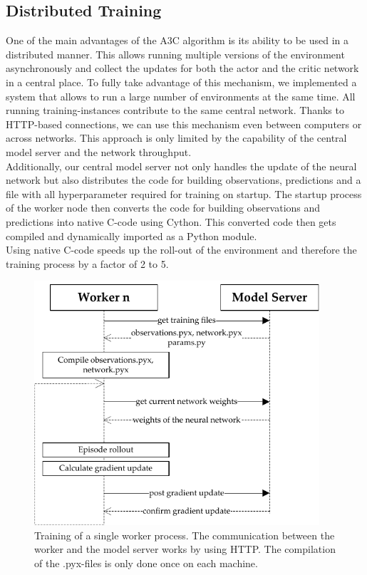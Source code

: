 \subsection*{Distributed Training}
One of the main advantages of the A3C algorithm is its ability to be used in a distributed manner. This allows running multiple versions of the environment asynchronously and collect the updates for both the actor and the critic network in a central place. To fully take advantage of this mechanism, we implemented a system that allows to run a large number of environments at the same time. All running training-instances contribute to the same central network. Thanks to HTTP-based connections, we can use this mechanism even between computers or across networks. This approach is only limited by the capability of the central model server and the network throughput.\\
Additionally, our central model server not only handles the update of the neural network but also distributes the code for building observations, predictions and a file with all hyperparameter required for training on startup. The startup process of the worker node then converts the code for building observations and predictions into native C-code using Cython. This converted code then gets compiled and dynamically imported as a Python module.\\
Using native C-code speeds up the roll-out of the environment and therefore the training process by a factor of 2 to 5.
\begin{figure}[H]
	\centering
	\includegraphics[width=300pt]{diagrams/distributed_training_update_2.pdf}
	\caption{Training of a single worker process. The communication between the worker and the model server works by using HTTP. The compilation of the .pyx-files is only done once on each machine.}
	\label{obs_descr} %
\end{figure}
